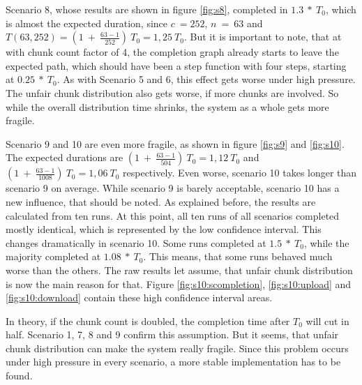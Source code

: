 Scenario 8, whose results are shown in figure \ref{fig:s8}, completed in $1.3\:*\:T_0$, which is almost the expected duration, since $c\:=252$, $n\:=\:63$ and $T(63, 252) = (1\:+\:\frac{63-1}{252})\:T_0 = 1,25\:T_0$. But it is important to note, that at with chunk count factor of 4, the completion graph already starts to leave the expected path, which should have been a step function with four steps, starting at $0.25\:*\:T_0$. As with Scenario 5 and 6, this effect gets worse under high pressure. The unfair chunk distribution also gets worse, if more chunks are involved. So while the overall distribution time shrinks, the system as a whole gets more fragile.

Scenario 9 and 10 are even more fragile, as shown in figure \ref{fig:s9} and \ref{fig:s10}. The expected durations are $(1\:+\:\frac{63-1}{504})\:T_0 = 1,12\:T_0$ and $(1\:+\:\frac{63-1}{1008})\:T_0 = 1,06\:T_0$ respectively. Even worse, scenario 10 takes longer than scenario 9 on average. While scenario 9 is barely acceptable, scenario 10 has a new influence, that should be noted. As explained before, the results are calculated from ten runs. At this point, all ten runs of all scenarios completed mostly identical, which is represented by the low confidence interval. This changes dramatically in scenario 10. Some runs completed at $1.5\:*\:T_0$, while the majority completed at $1.08\:*\:T_0$. This means, that some runs behaved much worse than the others. The raw results let assume, that unfair chunk distribution is now the main reason for that. Figure \ref{fig:s10:scompletion}, \ref{fig:s10:upload} and \ref{fig:s10:download} contain these high confidence interval areas. 

In theory, if the chunk count is doubled, the completion time after $T_0$ will cut in half. Scenario 1, 7, 8 and 9 confirm this assumption. But it seems, that unfair chunk distribution can make the system really fragile. Since this problem occurs under high pressure in every scenario, a more stable implementation has to be found.

\vfill


